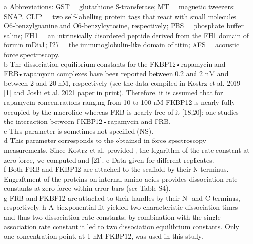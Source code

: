 \documentclass{biophys-new}
\begin{document}
\noindent
a Abbreviations: GST = glutathione S-transferase; MT = magnetic tweezers; SNAP, CLIP = two self-labelling protein tags that react with small molecules O6-benzylguanine and O6-benzylcytosine, respectively; PBS = phosphate buffer saline; FH1 = an intrinsically disordered peptide derived from the FH1 domain of formin mDia1; I27 = the immunoglobulin-like domain of titin; AFS = acoustic force spectroscopy.\\
b The dissociation equilibrium constants for the FKBP12•rapamycin and FRB•rapamycin complexes have been reported between  0.2 and 2 nM and between  2 and 20 nM, respectively (see the data compiled in Kostrz et al. 2019 [1] and Joshi et al. 2021 paper in print). Therefore, it is assumed that for rapamycin concentrations ranging from 10 to 100 nM FKBP12 is nearly fully occupied by the macrolide whereas FRB is nearly free of it [18,20]: one studies the interaction between FKBP12•rapamycin and FRB.\\
c This parameter is sometimes not specified (NS).\\
d This parameter corresponds to the  obtained in force spectroscopy measurements. Since Kostrz et al. provided , the logarithm of the rate constant at zero-force, we computed  and  [21].   
e Data given for different replicates.\\
f Both FRB and FKBP12 are attached to the scaffold by their N-terminus. Engraftment of the proteins on internal amino acids provides dissociation rate constants at zero force within error bars (see Table S4).\\
g FRB and FKBP12 are attached to their handles by their N- and C-terminus, respectively.
h A biexponential fit yielded two characteristic dissociation times and thus two dissociation rate constants; by combination with the single association rate constant it led to two dissociation equilibrium constants. Only one concentration point, at 1 nM FKBP12, was used in this study.\\

\newpage
\end{document}
